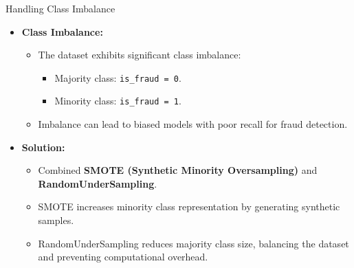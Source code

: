 \documentclass{beamer}
\begin{document}
\begin{frame}{Handling Class Imbalance}
    \begin{itemize}
        \item \textbf{Class Imbalance:}
        \begin{itemize}
            \item The dataset exhibits significant class imbalance:
            \begin{itemize}
                \item Majority class: \texttt{is\_fraud = 0}.
                \item Minority class: \texttt{is\_fraud = 1}.
            \end{itemize}
            \item Imbalance can lead to biased models with poor recall for fraud detection.
        \end{itemize}
        \item \textbf{Solution:} 
        \begin{itemize}
            \item Combined \textbf{SMOTE (Synthetic Minority Oversampling)} and \textbf{RandomUnderSampling}.
            \item SMOTE increases minority class representation by generating synthetic samples.
            \item RandomUnderSampling reduces majority class size, balancing the dataset and preventing computational overhead.
        \end{itemize}
    \end{itemize}
\end{frame}
\end{document}
